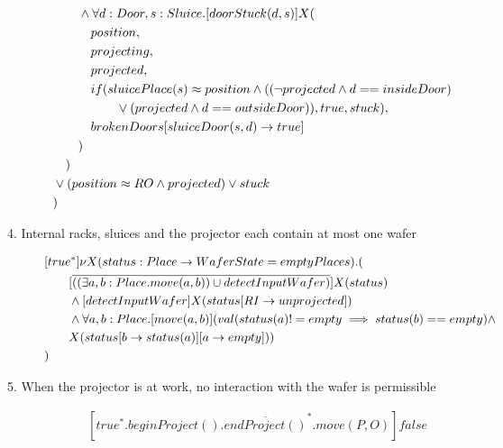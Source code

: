 \begin{description}
\begin{align*}
&  \tab\tab  \wedge \forall d:Door,s:Sluice.[doorStuck(d, s)]X( \\
&  \tab\tab                        \tab                        position, \\
&  \tab\tab                        \tab                        projecting, \\
&  \tab\tab                        \tab                        projected, \\
&  \tab\tab                        \tab                        if(sluicePlace(s) \approx position \wedge ((\neg projected \wedge d == insideDoor) \\
& \tab\tab\tab\tab\tab \vee (projected \wedge d == outsideDoor)), true, stuck), \\
&  \tab\tab                       \tab brokenDoors[sluiceDoor(s,d)\to true] \\
&  \tab\tab                                              ) \\
&  \tab ) \\
&  \vee (position \approx RO \wedge projected) \vee stuck \\
&)
	\end{align*}

 
 \item[4. Internal racks, sluices and the projector each contain at most one wafer]
    
\begin{align*}
		&[true^*] \nu X(status:Place \to WaferState=emptyPlaces).(\\
  & \tab\tab [\overline{((\exists a,b:Place.move(a,b)) \cup detectInputWafer)}]X(status)\\
  & \tab\tab  \wedge [detectInputWafer]X(status[RI \to unprojected])\\
  & \tab\tab  \wedge \forall a,b:Place.[move(a, b)](val(status(a) != empty \implies status(b)  == empty) \wedge \\ & \tab \tab X(status[b \to status(a)][a \to empty]))\\
&)
	\end{align*}

 
 \item[5. When the projector is at work, no interaction with the wafer is permissible]
 	\begin{align*}
 		&[true^*.beginProject().\overline{endProject()}^*.move(P,O)]false
	\end{align*}
	

\end{description}
